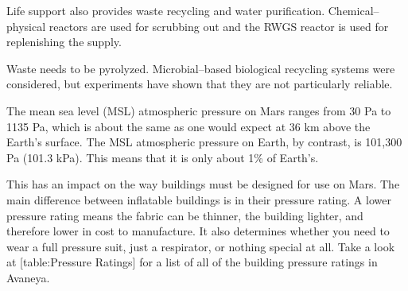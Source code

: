 Life support also provides waste recycling and water purification. Chemical--physical reactors are used for scrubbing  out and the RWGS reactor is used for replenishing the  supply. 

Waste needs to be pyrolyzed. Microbial--based biological recycling systems were considered, but experiments have shown that they are not particularly reliable.

The mean sea level (MSL) atmospheric pressure on Mars ranges from 30 Pa to 1135 Pa, which is about the same as one would expect at 36 km above the Earth's surface. The MSL atmospheric pressure on Earth, by contrast, is 101,300 Pa (101.3 kPa). This means that it is only about 1\% of Earth's.

This has an impact on the way buildings must be designed for use on Mars. The main difference between inflatable buildings is in their pressure rating. A lower pressure rating means the fabric can be thinner, the building lighter, and therefore lower in cost to manufacture. It also determines whether you need to wear a full pressure suit, just a respirator, or nothing special at all. Take a look at [table:Pressure Ratings] for a list of all of the building pressure ratings in Avaneya.

